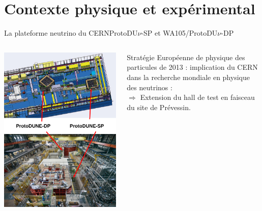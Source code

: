   \section[Contexte]{Contexte physique et expérimental}
    
    \begin{frame}{La plateforme neutrino du CERN}{ProtoDU$\nu$-SP et WA105/ProtoDU$\nu$-DP}
        \begin{columns}
            \begin{column}{0.5\textwidth}
                \includegraphics[height=0.9\textheight]{./pictures/neutrino_platform.png}
            \end{column}
            \begin{column}{0.5\textwidth}
                \begin{scriptsize}
                    Stratégie Européenne de physique des particules de 2013 : implication du CERN dans la recherche mondiale en physique des neutrinos : \\ $\Rightarrow$ Extension du hall de test en faisceau du site de Prévessin.\vspace{0.4cm}

\end{scriptsize}
\end{column}
\end{columns}
\end{frame}
